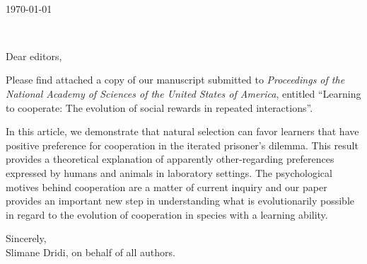\documentclass[11pt,letterpaper]{letter} %
\def\opening#1{\thispagestyle{empty}
{\centering\fromaddress \vspace{0.6in} \\ %
\hspace*{\longindentation}\today\hspace*{\fill}\par} %
{\raggedright \toname \\ \toaddress \par} %
\vspace{0.4in} %
\noindent #1 %
}
\begin{document}

\begin{letter}
{
}


\opening{Dear editors,}


Please find attached a copy of our manuscript submitted to \emph{Proceedings of the National Academy of Sciences of the United States of America}, entitled ``Learning to cooperate: The evolution of social rewards in repeated interactions''.


In this article, we demonstrate that natural selection can favor learners that have positive preference for cooperation in the iterated prisoner's dilemma. This result provides a theoretical explanation of apparently other-regarding preferences expressed by humans and animals in laboratory settings. The psychological motives behind cooperation are a matter of current inquiry and our paper provides an important new step in understanding what is evolutionarily possible in regard to the evolution of cooperation in species with a learning ability.



\closing{Sincerely,\\%
Slimane Dridi, on behalf of all authors.}




\end{letter}
\end{document}
